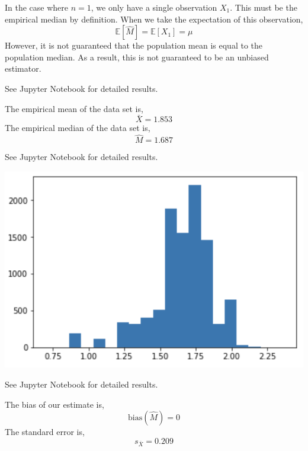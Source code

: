 \documentclass[12pt,twoside]{article}
\begin{document}
\begin{problems}
\begin{problemparts}
\end{problemparts}

\newpage
\problem  %

\begin{problemparts}

\problempart %

In the case where $n = 1$, we only have a single observation $X_1$. This must 
be the empirical median by definition. When we take the expectation of this
observation,
$$ \mathbb{E}[\hat{M}] = \mathbb{E}[X_1] = \mu $$
However, it is not guaranteed that the population mean is equal to the
population median. As a result, this is not guaranteed to be an unbiased
estimator.

\problempart %

See Jupyter Notebook for detailed results.

The empirical mean of the data set is,
$$ \bar{X} = \boxed{1.853} $$
The empirical median of the data set is,
$$ \hat{M} = \boxed{1.687} $$

\problempart %

See Jupyter Notebook for detailed results.

\begin{center}
    \includegraphics[scale=0.75]{PS2P3C.png}
\end{center}

\problempart %

See Jupyter Notebook for detailed results.

The bias of our estimate is,
$$ \mathrm{bias}(\hat{M}) = \boxed{0} $$
The standard error is,
$$ s_{\bar{X}} = \boxed{0.209} $$

\problempart %


\end{problemparts}
\end{problems}
\end{document}
